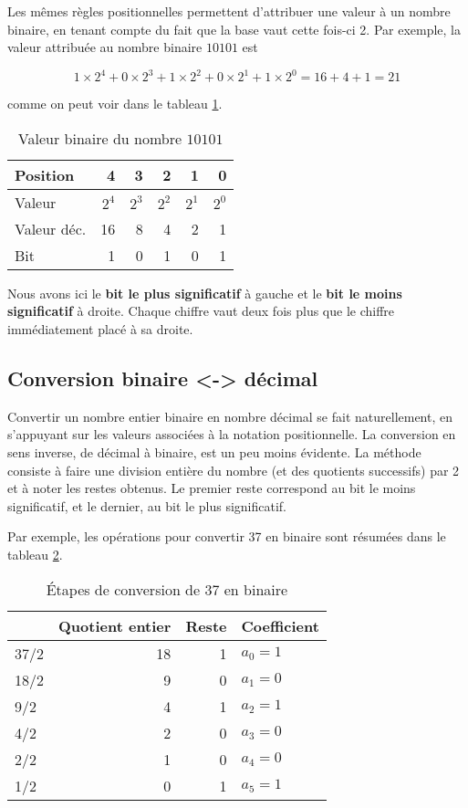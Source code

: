 \documentclass[11pt]{article}
\begin{document}
Les mêmes règles positionnelles permettent d'attribuer une valeur à un
nombre binaire, en tenant compte du fait que la base vaut cette
fois-ci 2. Par exemple, la valeur attribuée au nombre binaire
\(10101\) est 

$$ 1 \times 2^4 + 0 \times 2^3 + 1 \times 2^2 + 0 \times 2^1 + 1
\times 2^0 = 16+4+1= 21 $$

comme on peut voir dans le tableau \ref{tab:orge0b46db}.

\begin{table}[htbp]
\caption{\label{tab:orge0b46db}Valeur binaire du nombre \(10101\)}
\centering
\begin{tabular}{lrrrrr}
Position & 4 & 3 & 2 & 1 & 0\\[0pt]
\hline
Valeur & \(2^4\) & \(2^3\) & \(2^2\) & \(2^1\) & \(2^0\)\\[0pt]
Valeur déc. & 16 & 8 & 4 & 2 & 1\\[0pt]
Bit & 1 & 0 & 1 & 0 & 1\\[0pt]
\end{tabular}
\end{table}

Nous avons ici le \textbf{bit le plus significatif} à gauche et le \textbf{bit le
moins significatif} à droite. Chaque chiffre vaut deux fois plus que le
chiffre immédiatement placé à sa droite.

\subsection{Conversion binaire <-> décimal}
\label{sec:orgbf5f3f9}

Convertir un nombre entier binaire en nombre décimal se fait
naturellement, en s'appuyant sur les valeurs associées à la notation
positionnelle. La conversion en sens inverse, de décimal à binaire,
est un peu moins évidente. La méthode consiste à faire une division
entière du nombre (et des quotients successifs) par 2 et à noter les
restes obtenus. Le premier reste correspond au bit le moins
significatif, et le dernier, au bit le plus significatif.

Par exemple, les opérations pour convertir 37 en binaire sont résumées
dans le tableau \ref{tab:org7550639}.

\begin{table}[htbp]
\caption{\label{tab:org7550639}Étapes de conversion de 37 en binaire}
\centering
\begin{tabular}{lrrl}
 & Quotient entier & Reste & Coefficient\\[0pt]
\hline
37/2 & 18 & 1 & \(a_0 = 1\)\\[0pt]
18/2 & 9 & 0 & \(a_1 = 0\)\\[0pt]
9/2 & 4 & 1 & \(a_2 = 1\)\\[0pt]
4/2 & 2 & 0 & \(a_3 = 0\)\\[0pt]
2/2 & 1 & 0 & \(a_4 = 0\)\\[0pt]
1/2 & 0 & 1 & \(a_5 = 1\)\\[0pt]
\end{tabular}
\end{table}
\end{document}
